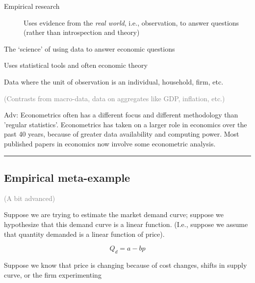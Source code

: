 \documentclass[]{article}
\providecommand{\tightlist}{%
  \setlength{\itemsep}{0pt}\setlength{\parskip}{0pt}}
\begin{document}
\begin{description}
\item[Empirical research]
Uses evidence from the \emph{real world}, i.e., observation, to answer
questions (rather than introspection and theory)
\end{description}

\bigskip

\begin{description}
\tightlist
\item[Econometrics]
The `science' of using data to answer economic questions

Uses statistical tools and often economic theory
\end{description}

\bigskip

\begin{description}
\tightlist
\item[Micro-data]
Data where the unit of observation is an individual, household, firm,
etc.

\textcolor{gray}{(Contrasts from macro-data, data on aggregates like GDP, inflation, etc.)}
\end{description}

\textcolor{RawSienna}{Adv: Econometrics often has a different focus and different methodology than 'regular statistics'. Econometrics has taken on a larger role in economics over the past 40 years, because of greater data availability and computing power.  Most published papers in economics now involve some econometric analysis.}

\begin{center}\rule{0.5\linewidth}{\linethickness}\end{center}

\hypertarget{empirical-meta-example}{%
\subsection{Empirical meta-example}\label{empirical-meta-example}}

\textcolor{gray}{(A bit advanced)}

Suppose we are trying to estimate the market demand curve; suppose we
hypothesize that this demand curve is a linear function. (I.e., suppose
we assume that quantity demanded is a linear function of price).

\[Q_d = a-bp\]

Suppose we know that price is changing because of cost changes, shifts
in supply curve, or the firm experimenting
\end{document}
